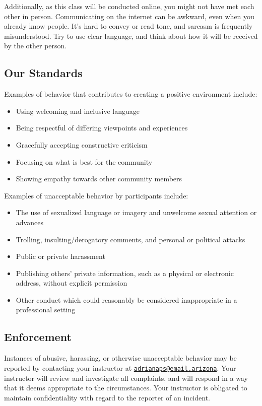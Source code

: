 \documentclass[
]{book}
\begin{document}
Additionally, as this class will be conducted online, you might not have met each other in person. Communicating on the internet can be awkward, even when you already know people. It's hard to convey or read tone, and sarcasm is frequently misunderstood. Try to use clear language, and think about how it will be received by the other person.

\hypertarget{our-standards}{%
\subsection{Our Standards}\label{our-standards}}

Examples of behavior that contributes to creating a positive environment include:

\begin{itemize}
\item
  Using welcoming and inclusive language
\item
  Being respectful of differing viewpoints and experiences
\item
  Gracefully accepting constructive criticism
\item
  Focusing on what is best for the community
\item
  Showing empathy towards other community members
\end{itemize}

Examples of unacceptable behavior by participants include:

\begin{itemize}
\item
  The use of sexualized language or imagery and unwelcome sexual attention or advances
\item
  Trolling, insulting/derogatory comments, and personal or political attacks
\item
  Public or private harassment
\item
  Publishing others' private information, such as a physical or electronic address, without explicit permission
\item
  Other conduct which could reasonably be considered inappropriate in a professional setting
\end{itemize}

\hypertarget{enforcement}{%
\subsection{Enforcement}\label{enforcement}}

Instances of abusive, harassing, or otherwise unacceptable behavior may be reported by contacting your instructor at \href{mailto:adrianaps@email.arizona}{\nolinkurl{adrianaps@email.arizona}}. Your instructor will review and investigate all complaints, and will respond in a way that it deems appropriate to the circumstances. Your instructor is obligated to maintain confidentiality with regard to the reporter of an incident.
\end{document}
